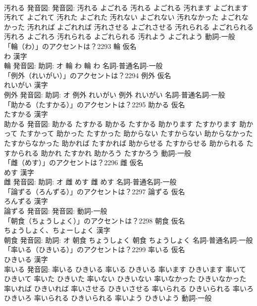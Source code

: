\documentclass[8pt]{extreport}
\begin{document}
\begin{CJK}{UTF8}{min}
\\	汚れる 発音図: 発音図:	汚れる よごれる		汚れる よごれる 汚れます よごれます 汚れて よごれて 汚れた よごれた 汚れない よごれない 汚れなかった よごれなかった 汚れれば よごれれば 汚れさせる よごれさせる 汚れられる よごれられる 汚れろ よごれろ 汚れられる よごれられる 汚れよう よごれよう				動詞-一般 
\\	「輪（わ）」のアクセントは？2293	輪 仮名　
\\	わ 漢字　
\\	輪 発音図: 助詞: オ	輪 わ		輪 わ				名詞-普通名詞-一般 
\\	「例外（れいがい）」のアクセントは？2294	例外 仮名　
\\	れいがい 漢字　
\\	例外 発音図: 助詞: オ	例外 れいがい		例外 れいがい				名詞-普通名詞-一般 
\\	「助かる（たすかる）」のアクセントは？2295	助かる 仮名　
\\	たすかる 漢字　
\\	助かる 発音図:	助かる たすかる		助かる たすかる 助かります たすかります 助かって たすかって 助かった たすかった 助からない たすからない 助からなかった たすからなかった 助かれば たすかれば 助からせる たすからせる 助かられる たすかられる 助かれ たすかれ 助かろう たすかろう				動詞-一般 
\\	「雌（めす）」のアクセントは？2296	雌 仮名　
\\	めす 漢字　
\\	雌 発音図: 助詞: オ	雌 めす		雌 めす				名詞-普通名詞-一般 
\\	「論ずる（ろんずる）」のアクセントは？2297	論ずる 仮名　
\\	ろんずる 漢字　
\\	論ずる 発音図: 発音図:							動詞-一般 
\\	「朝食（ちょうしょく）」のアクセントは？2298	朝食 仮名　
\\	ちょうしょく、ちょーしょく 漢字　
\\	朝食 発音図: 助詞: オ	朝食 ちょうしょく		朝食 ちょうしょく				名詞-普通名詞-一般 
\\	「率いる（ひきいる）」のアクセントは？2299	率いる 仮名　
\\	ひきいる 漢字　
\\	率いる 発音図:	率いる ひきいる		率いる ひきいる 率います ひきいます 率いて ひきいて 率いた ひきいた 率いない ひきいない 率いなかった ひきいなかった 率いれば ひきいれば 率いさせる ひきいさせる 率いられる ひきいられる 率いろ ひきいろ 率いられる ひきいられる 率いよう ひきいよう				動詞-一般 

\end{CJK}
\end{document}
